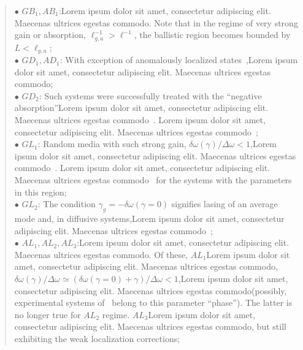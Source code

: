 \begin{quote}
$\bullet$ $GB_1,AB_1$:Lorem ipsum dolor sit amet, consectetur adipiscing elit. Maecenas ultrices egestas commodo. Note that in the regime of very strong gain or absorption, $\ell_{g,a}^{-1}>\ell^{-1}$, the ballistic region becomes bounded by $L<\ell_{g,a}$;\\
$\bullet$ $GD_1,AD_1$: With exception of anomalously localized states~\cite{1991_Altshuler,1995_Muzykantskii_ALS,2000_Mirlin,2000_Cao_localization,2002_Apalkov_ALS,2004_Burin_ALS},Lorem ipsum dolor sit amet, consectetur adipiscing elit. Maecenas ultrices egestas commodo; \\
$\bullet$ $GD_2$: Such systems were successfully treated with the ``negative absorption''Lorem ipsum dolor sit amet, consectetur adipiscing elit. Maecenas ultrices egestas commodo~\cite{1968_Letokhov,1994_lawandy_nature,1996_John_RandLaser,1996_Wiersma_RandomLaser,1996_Genack_DiffRandomLaser,
1999_Cao_RandomLaserPRL,1999_Vardeny_PolymerRandomLaser,2001_vansoest_thesis,2004_Florescu}. Lorem ipsum dolor sit amet, consectetur adipiscing elit. Maecenas ultrices egestas commodo~\cite{2005_Yamilov_correlations,2004_Yamilov_intensity,2006_Yamilov_conductance};\\
$\bullet$ $GL_1$: Random media with such strong gain, $\delta\omega(\gamma)/\Delta\omega<1$,Lorem ipsum dolor sit amet, consectetur adipiscing elit. Maecenas ultrices egestas commodo~\cite{1995_zyuzin_fluctuations,1997_Burkov_Zyuzin}. Lorem ipsum dolor sit amet, consectetur adipiscing elit. Maecenas ultrices egestas commodo~\cite{1999_Jiang,2002_Zhang_phys_solutions} for the systems with the parameters in this region;\\
$\bullet$ $GL_2$: The condition $\gamma_g=-\delta\omega(\gamma =0)$ signifies lasing of an average mode and, in diffusive systems,Lorem ipsum dolor sit amet, consectetur adipiscing elit. Maecenas ultrices egestas commodo~\cite{1968_Letokhov}; \\
$\bullet$ $AL_1,AL_2,AL_3$:Lorem ipsum dolor sit amet, consectetur adipiscing elit. Maecenas ultrices egestas commodo. Of these, $AL_1$Lorem ipsum dolor sit amet, consectetur adipiscing elit. Maecenas ultrices egestas commodo, $\delta\omega(\gamma)/\Delta\omega\simeq(\delta\omega(\gamma=0)+\gamma)/\Delta\omega<1$,Lorem ipsum dolor sit amet, consectetur adipiscing elit. Maecenas ultrices egestas commodo(possibly, experimental systems of~\cite{2000_chabanov_nature} belong to this parameter ``phase''). The latter is no longer true for $AL_2$ regime. $AL_3$Lorem ipsum dolor sit amet, consectetur adipiscing elit. Maecenas ultrices egestas commodo, but still exhibiting the weak localization corrections;\\

\end{quote}
